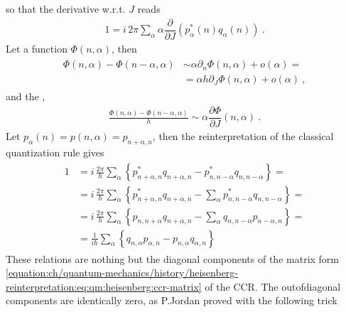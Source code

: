 \documentclass[letterpaper,10pt,english]{jupyterBook}
\begin{document}
\sphinxAtStartPar
so that the derivative w.r.t. \(J\) reads
\begin{equation*}
\begin{split}1 = i \, 2 \pi \sum_{\alpha} \alpha \dfrac{\partial}{\partial J} \left( p^*_{\alpha}(n) q_{\alpha}(n) \right) \ . \end{split}
\end{equation*}
\sphinxAtStartPar
{} Let a function \(\Phi(n,\alpha)\), then
\begin{equation*}
\begin{split}\begin{aligned}
  \Phi(n, \alpha) - \Phi(n - \alpha, \alpha) 
  & \sim \alpha \partial_n \Phi(n, \alpha) + o(\alpha) = \\
  & = \alpha h \partial_J \Phi(n, \alpha) + o(\alpha) \ ,
\end{aligned}\end{split}
\end{equation*}
\sphinxAtStartPar
and the ,
\begin{equation*}
\begin{split}\frac{\Phi(n, \alpha) - \Phi(n - \alpha, \alpha) }{ h } \sim \alpha \dfrac{\partial \Phi}{\partial J} (n, \alpha) \ .\end{split}
\end{equation*}
\sphinxAtStartPar
Let \(p_\alpha(n) = p(n,\alpha) = p_{n+\alpha,n}\), then the reinterpretation of the classical quantization rule gives
\begin{equation*}
\begin{split}\begin{aligned}
  1
  & = i \, \frac{2 \pi}{h} \sum_{\alpha} \left\{ p^*_{n+\alpha,n} q_{n+\alpha,n} - p^*_{n,n-\alpha} q_{n,n-\alpha} \right\} = \\
  & = i \, \frac{2 \pi}{h} \sum_{\alpha} \left\{ p^*_{n+\alpha,n} q_{n+\alpha,n} - \sum_\alpha p^*_{n,n-\alpha} q_{n,n-\alpha} \right\} = \\
  & = i \, \frac{2 \pi}{h} \sum_{\alpha} \left\{ p_{n,n+\alpha} q_{n+\alpha,n}   - \sum_\alpha q_{n,n-\alpha} p_{n-\alpha,n}  \right\} = \\
  & = \frac{1}{i \hbar} \sum_{\alpha} \left\{  q_{n,\alpha} p_{\alpha,n} - p_{n,\alpha} q_{\alpha,n} \right\}
\end{aligned}\end{split}
\end{equation*}
\sphinxAtStartPar
These relations are nothing but the diagonal components of the matrix form \eqref{equation:ch/quantum-mechanics/history/heisenberg-reinterpretation:eq:qm:heisenberg:ccr-matrix} of the CCR. The out\sphinxhyphen{}of\sphinxhyphen{}diagonal components are identically zero, as P.Jordan proved with the following trick
\end{document}
